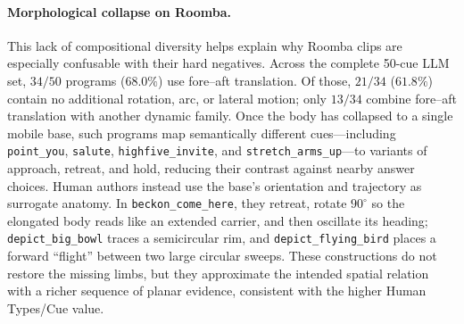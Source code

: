 \documentclass[letterpaper,10pt,conference]{ieeeconf}
\begin{document}
\paragraph{Morphological collapse on Roomba.} This lack of compositional diversity helps explain why Roomba clips are especially confusable with their hard negatives. Across the complete 50-cue LLM set, $34/50$ programs ($68.0\%$) use fore--aft translation. Of those, $21/34$ ($61.8\%$) contain no additional rotation, arc, or lateral motion; only $13/34$ combine fore--aft translation with another dynamic family. Once the body has collapsed to a single mobile base, such programs map semantically different cues---including \texttt{point\_you}, \texttt{salute}, \texttt{highfive\_invite}, and \texttt{stretch\_arms\_up}---to variants of approach, retreat, and hold, reducing their contrast against nearby answer choices. Human authors instead use the base's orientation and trajectory as surrogate anatomy. In \texttt{beckon\_come\_here}, they retreat, rotate $90^\circ$ so the elongated body reads like an extended carrier, and then oscillate its heading; \texttt{depict\_big\_bowl} traces a semicircular rim, and \texttt{depict\_flying\_bird} places a forward ``flight'' between two large circular sweeps. These constructions do not restore the missing limbs, but they approximate the intended spatial relation with a richer sequence of planar evidence, consistent with the higher Human Types/Cue value.
\end{document}
